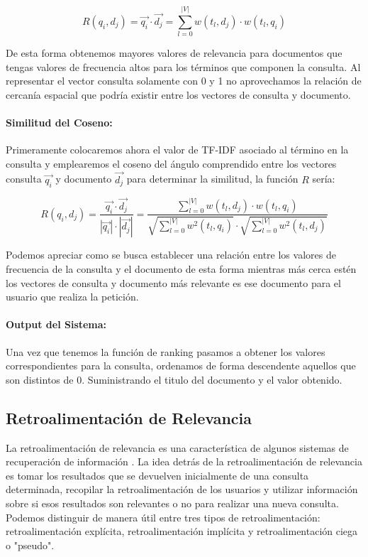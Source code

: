 \documentclass[runningheads,a4paper]{llncs}
\begin{document}
\begin{equation}
	R(q_i, d_j) = \overrightarrow{q_i} \cdot \overrightarrow{d_j} = \sum_{l = 0}^{|V|} w(t_l, d_j) \cdot w(t_l, q_i)
\end{equation}

De esta forma obtenemos mayores valores de relevancia para documentos que tengas valores de frecuencia altos para los términos que componen la consulta. Al representar el vector consulta solamente con 0 y 1 no aprovechamos la relación de cercanía espacial que podría existir entre los vectores de consulta y documento.

\paragraph{Similitud del Coseno:} Primeramente colocaremos ahora el valor de TF-IDF asociado al término en la consulta y emplearemos el coseno del ángulo comprendido entre los vectores consulta $\overrightarrow{q_i}$ y documento $\overrightarrow{d_j}$ para determinar la similitud, la función $R$ sería:

\begin{equation}
	R(q_i, d_j) = \frac{\overrightarrow{q_i} \cdot \overrightarrow{d_j}}{|\overrightarrow{q_i}| \cdot |\overrightarrow{d_j}|} = \frac{\sum_{l = 0}^{|V|} w(t_l, d_j) \cdot w(t_l, q_i)}{\sqrt{\sum_{l = 0}^{|V|} w^2(t_l, q_i)} \cdot \sqrt{\sum_{l = 0}^{|V|} w^2(t_l, d_j)}}
\end{equation}

Podemos apreciar como se busca establecer una relación entre los valores de frecuencia de la consulta y el documento de esta forma mientras más cerca estén los vectores de consulta y documento más relevante es ese documento para el usuario que realiza la petición.

\paragraph{Output del Sistema:} Una vez que tenemos la función de ranking pasamos a obtener los valores correspondientes para la consulta, ordenamos de forma descendente aquellos que son distintos de 0. Suministrando el titulo del documento y el valor obtenido.

\subsection*{Retroalimentación de Relevancia}

La retroalimentación de relevancia es una característica de algunos sistemas de recuperación de información . La idea detrás de la retroalimentación de relevancia es tomar los resultados que se devuelven inicialmente de una consulta determinada, recopilar la retroalimentación de los usuarios y utilizar información sobre si esos resultados son relevantes o no para realizar una nueva consulta. Podemos distinguir de manera útil entre tres tipos de retroalimentación: retroalimentación explícita, retroalimentación implícita y retroalimentación ciega o "pseudo".
\end{document}
